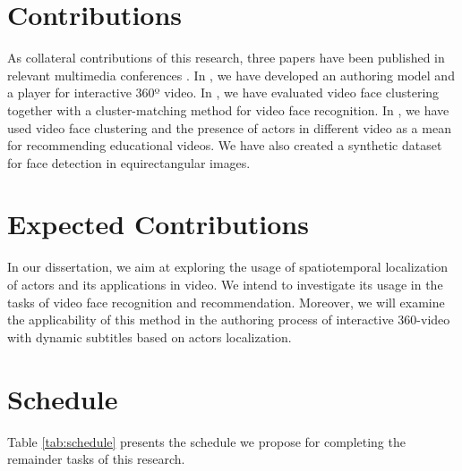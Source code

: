 \section{Contributions}
\label{sec_4}
 As collateral contributions of this research, three papers have been published in relevant multimedia conferences \cite{mendes2020cluster, mendes2020authoring, mendes2020ISM}. In \cite{mendes2020authoring}, we have developed an authoring model and a player for interactive 360º video. In \cite{mendes2020cluster}, we have evaluated video face clustering together with a cluster-matching method for video face recognition. In \cite{mendes2020ISM}, we have used video face clustering and the presence of actors in different video as a mean for recommending educational videos. We have also created a synthetic dataset for face detection in equirectangular images.

\section{Expected Contributions}
\label{sec_5}
In our dissertation, we aim at exploring the usage of spatiotemporal localization of actors and its applications in video. We intend to investigate its usage in the tasks of video face recognition and recommendation. Moreover, we will examine the applicability of this method in the authoring process of interactive 360-video with dynamic subtitles based on actors localization.


\section{Schedule}
\label{sec_6}
Table \ref{tab:schedule} presents the schedule we propose for completing the remainder tasks of this research.

